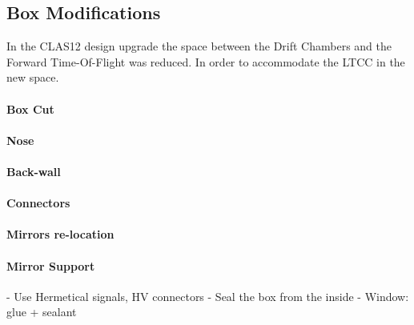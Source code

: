 \subsection{Box Modifications}

In the CLAS12 design upgrade the space between the Drift Chambers and the Forward Time-Of-Flight was reduced.
In order to accommodate the LTCC in the new space. 



\paragraph{Box Cut}
\paragraph{Nose}
\paragraph{Back-wall}
\paragraph{Connectors}

\paragraph{Mirrors re-location}
\paragraph{Mirror Support}



- Use Hermetical signals, HV connectors
- Seal the box from the inside
- Window: glue + sealant




